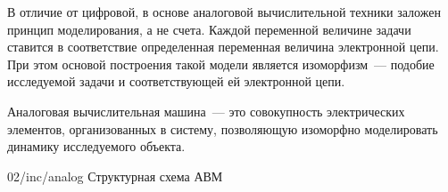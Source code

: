 В отличие от цифровой, в основе аналоговой вычислительной техники заложен принцип моделирования, а не счета. Каждой переменной величине задачи ставится в соответствие определенная переменная величина электронной цепи. При этом основой построения такой модели является изоморфизм~--- подобие исследуемой задачи и соответствующей ей электронной цепи.

\begin{dd}
    Аналоговая вычислительная машина~--- это совокупность электрических элементов, организованных в систему, позволяющую изоморфно моделировать динамику исследуемого объекта.
\end{dd}

\image
{\textwidth}
{02/inc/analog}
{Структурная схема АВМ}